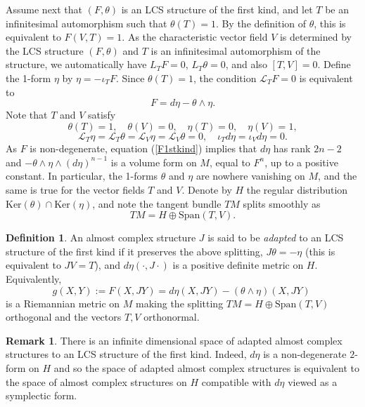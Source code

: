 \documentclass[a4paper,11pt]{amsart}
\theoremstyle{definition}
\newtheorem{defn}[thm]{Definition}
\newtheorem{rem}[thm]{Remark}
\renewcommand{\[}{\begin{equation*}}
\renewcommand{\]}{\end{equation*}}
\begin{document}
Assume next that $(F, \theta)$ is an LCS structure of the first kind, and let $T$ be an infinitesimal automorphism such that $\theta(T) = 1$. By the definition of $\theta$, this is equivalent to $F(V,T) = 1$. As the characteristic vector field $V$ is determined by the LCS structure $(F, \theta)$ and $T$ is an infinitesimal automorphism of the structure, we automatically have $L_T F = 0$, $L_T \theta = 0$, and also  $[T,V] = 0$. Define the 1-form $\eta$ by $\eta = -\iota_T F$. Since $\theta(T) = 1$, the condition $\mathcal{L}_T F = 0$ is equivalent to
\begin{equation} \label{F1stkind} 
F = d\eta - \theta \wedge \eta.
\end{equation}
Note that $T$ and $V$ satisfy
$$\theta(T) = 1,\quad \theta(V) = 0,\quad \eta(T) =0,\quad \eta(V) =1,$$
$$ \mathcal{L}_T \eta = \mathcal{L}_T \theta = \mathcal{L}_V \eta = \mathcal{L}_V\theta = 0, \quad \iota_T d \eta = \iota_V d\eta = 0.$$
As $F$ is non-degenerate, equation (\ref{F1stkind}) implies that $d\eta$ has rank $2n-2$ and 
$-\theta \wedge \eta \wedge (d\eta)^{n-1}$ is a volume form on $M$, equal to $F^n$, up to a positive constant. In particular, the 1-forms $\theta$ and $\eta$ are nowhere vanishing on $M$, and the same is true for the vector fields $T$ and $V$. Denote by $H$ the regular distribution $\text{Ker}(\theta) \cap \text{Ker}(\eta)$, and note the tangent bundle $TM$ splits smoothly as
$$TM = H \oplus \text{Span}(T, V).$$

\begin{defn}\label{definition-adapted} An almost complex structure $J$ is said to be {\it adapted} to an LCS structure of the first kind if it preserves the above splitting, $J\theta = - \eta$ (this is equivalent to $JV = T$), and
$d \eta(\cdot, J\cdot)$ is a positive definite metric on $H$. Equivalently,
$$ g(X, Y) := F(X, JY) = d\eta(X, JY) - (\theta \wedge \eta)(X, JY) \; $$
is a Riemannian metric on $M$ making the splitting $TM = H \oplus \text{Span}(T,V)$ orthogonal and the vectors $T, V$ orthonormal. 
\end{defn}


\begin{rem}\label{infinite-pluricanonical}
There is an infinite dimensional space of adapted almost complex structures to an LCS structure of the first kind. Indeed, $d\eta$ is a non-degenerate $2$-form on $H$ and so the space of adapted almost complex structures is equivalent to the space of almost complex structures on $H$ compatible with $d\eta$ viewed as a symplectic form.
\end{rem}
\end{document}
